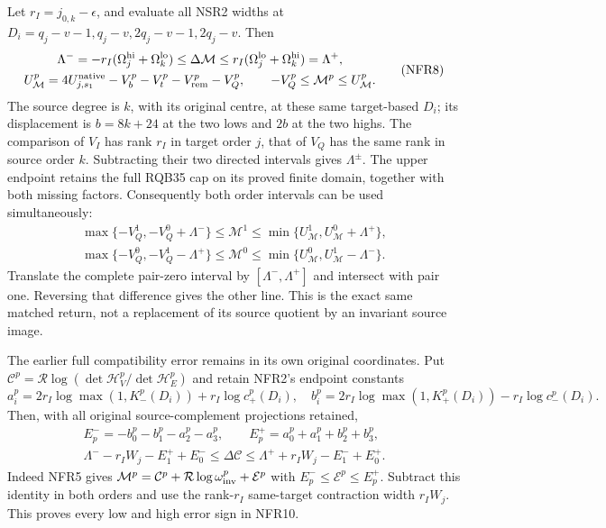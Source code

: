 \documentclass[11pt,a4paper]{article}
\begin{document}
Let $r_I=j_{0,k}-\epsilon$, and evaluate all NSR2 widths at
$D_i=q_j-v-1,q_j-v,2q_j-v-1,2q_j-v$. Then
\[
 \begin{gathered}
 \Lambda^-=-r_I(\Omega_j^{\rm hi}+\Omega_k^{\rm lo})
       \le\Delta\mathcal M
       \le r_I(\Omega_j^{\rm lo}+\Omega_k^{\rm hi})=\Lambda^+,\\
 U_{\mathcal M}^p=
       4U_{j,s_1}^{\rm native}-V_b^p-V_t^p-V_{\rm rem}^p-V_Q^p,
 \qquad -V_Q^p\le\mathcal M^p\le U_{\mathcal M}^p .
 \end{gathered}\tag{NFR8}
\]
The source degree is $k$, with its original centre, at these
same target-based $D_i$; its displacement is $b=8k+24$ at
the two lows and $2b$ at the two highs. The comparison of
$V_I$ has rank $r_I$ in target order $j$, that of $V_Q$
has the same rank in source order $k$. Subtracting their
two directed intervals gives $\Lambda^\pm$.
The upper endpoint retains the full RQB35 cap on its
proved finite domain, together with both missing factors.
Consequently both order intervals can be used simultaneously:
\[
 \begin{gathered}
 \max\{-V_Q^1,-V_Q^0+\Lambda^-\}\le\mathcal M^1
          \le\min\{U_{\mathcal M}^1,U_{\mathcal M}^0+\Lambda^+\},\\
 \max\{-V_Q^0,-V_Q^1-\Lambda^+\}\le\mathcal M^0
          \le\min\{U_{\mathcal M}^0,U_{\mathcal M}^1-\Lambda^-\}.
 \end{gathered}\tag{NFR9}
\]
Translate the complete pair-zero interval by
$[\Lambda^-,\Lambda^+]$ and intersect with pair one.
Reversing that difference gives the other line.
This is the exact same matched return, not a replacement
of its source quotient by an invariant source image.

The earlier full compatibility error remains in its own
original coordinates. Put
$\mathcal C^p=\mathcal R\log(\det\mathcal H_V^p/
\det\mathcal H_E^p)$ and retain NFR2's endpoint constants
\[
 a_i^p=2r_I\log\max(1,K_-^p(D_i))+r_I\log c_+^p(D_i),
 \quad
 b_i^p=2r_I\log\max(1,K_+^p(D_i))-r_I\log c_-^p(D_i).
\]
Then, with all original source-complement projections retained,
\[
 \begin{gathered}
 E_p^-=-b_0^p-b_1^p-a_2^p-a_3^p,\qquad
 E_p^+=a_0^p+a_1^p+b_2^p+b_3^p,\\
 \Lambda^- -r_IW_j-E_1^++E_0^-
       \le\Delta\mathcal C
       \le\Lambda^+ +r_IW_j-E_1^-+E_0^+ .
 \end{gathered}\tag{NFR10}
\]
Indeed NFR5 gives $\mathcal M^p=\mathcal C^p+
\mathcal R\log\omega_{\rm inv}^p+\mathcal E^p$ with
$E_p^-\le\mathcal E^p\le E_p^+$.
Subtract this identity in both orders and use the rank-$r_I$
same-target contraction width $r_IW_j$.
This proves every low and high error sign in NFR10.
\end{document}
